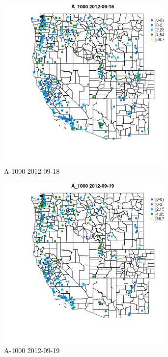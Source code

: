 \begin{figure} 
\centering  
\includegraphics[width=0.77\textwidth]{Code_Outputs/ML_input_report_ML_input_PM25_Step5_part_d_de_duplicated_aves_ML_input_MapObsA_10002012-09-18.jpg} 
\caption{\label{fig:ML_input_report_ML_input_PM25_Step5_part_d_de_duplicated_aves_ML_inputMapObsA_10002012-09-18}A-1000 2012-09-18} 
\end{figure} 
 

\begin{figure} 
\centering  
\includegraphics[width=0.77\textwidth]{Code_Outputs/ML_input_report_ML_input_PM25_Step5_part_d_de_duplicated_aves_ML_input_MapObsA_10002012-09-19.jpg} 
\caption{\label{fig:ML_input_report_ML_input_PM25_Step5_part_d_de_duplicated_aves_ML_inputMapObsA_10002012-09-19}A-1000 2012-09-19} 
\end{figure} 
 

